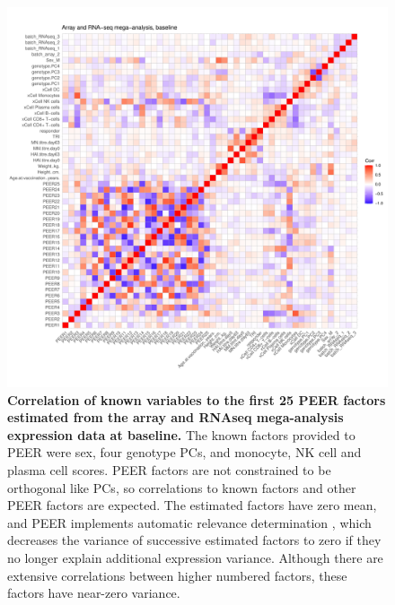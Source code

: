 \begin{figure}
    \centering
    \includegraphics[width=1.0\textwidth,page=1]{mainmatter/figures/chapter_03/peer_plotting.mega_v2.pdf}
    \caption[
    ]{
        \textbf{Correlation of known variables to the first 25 PEER factors estimated from the array and \gls{RNAseq} mega-analysis expression data at baseline.}
        The known factors provided to PEER were sex, four genotype \glspl{PC}, and monocyte, \gls{NK} cell and plasma cell  scores.
        PEER factors are not constrained to be orthogonal like \glspl{PC}, so correlations to known factors and other PEER factors are expected.
        The estimated factors have zero mean, and PEER implements automatic relevance determination \autocite{stegle2012UsingProbabilisticEstimation}, which decreases the variance of successive estimated factors to zero if they no longer explain additional expression variance.
        Although there are extensive correlations between higher numbered factors, these factors have near-zero variance.
    }
    \label{fig:hird_peer_corMatrix_v2_mega}
\end{figure}

